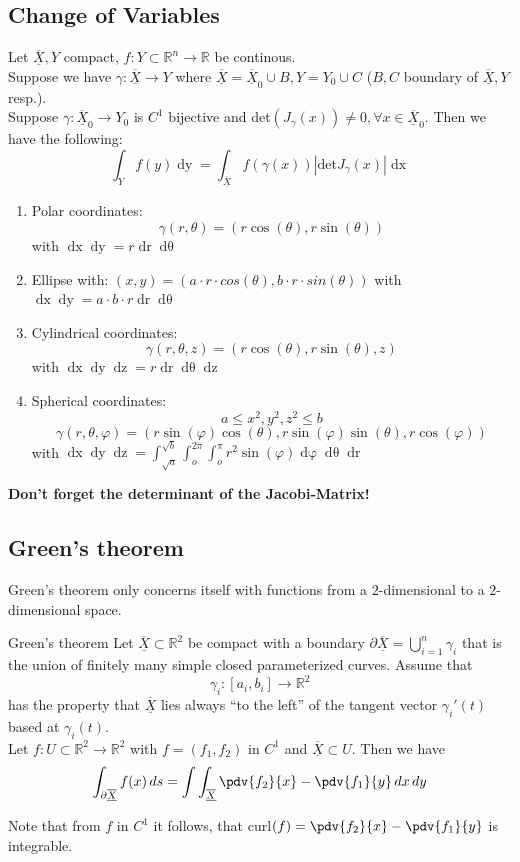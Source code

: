 \documentclass[a4paper,fontsize = 10pt]{article}
\def\R{\mathbb{R}}
\def\X{\underline{\overline{X}}}
\begin{document}
\subsection{Change of Variables}
Let $\X, Y$ compact, $f: Y \subset \R^n \to \R$ be continous. 
\\Suppose we have $\gamma: \X \to Y$ where $\X = \X_0 \cup B, Y = Y_0 \cup C$ ($B,C$ boundary of $\X,Y$ resp.).
\\Suppose $\gamma: \X_0 \to Y_0$ is $C^1$ bijective and det$(J_\gamma(x)) \neq 0, \forall x \in \X_0$.
Then we have the following:
\[\int_Yf(y)\mathop{dy} = \int_{\X}f(\gamma(x))|\text{det}J_{\gamma}(x)|\mathop{dx}\]

\begin{enumerate}
  \item Polar coordinates: \[\gamma(r, \theta) = (r \cos(\theta), r \sin(\theta))\] with \(\mathop{dx}\mathop{dy} = r \mathop{dr} \mathop{d\theta}\)
  \item Ellipse with: $(x,y) = (a \cdot r\cdot cos(\theta), b \cdot r \cdot sin(\theta))$ with $\mathop{dx} \mathop{dy} = a \cdot b \cdot r \mathop{dr} \mathop{d \theta}$
  \item Cylindrical coordinates: \[\gamma(r, \theta, z) = (r \cos(\theta), r \sin(\theta), z)\] with \(\mathop{dx} \mathop{dy} \mathop{dz} = r \mathop{dr} \mathop{d\theta} \mathop{dz}\)
  \item Spherical coordinates: \[ a \le x^2,y^2,z^2 \le b\] \[\gamma(r, \theta, \varphi) = (r\sin(\varphi)\cos(\theta), r \sin(\varphi)\sin(\theta), r \cos(\varphi))\] with \(\mathop{dx}\mathop{dy}\mathop{dz} = \int_{\sqrt{a}}^{\sqrt{b}}\int_{o}^{2\pi}\int_{o}^{\pi}  r^2 \sin(\varphi) \mathop{d\varphi} \mathop{d\theta} \mathop{dr}\)
\end{enumerate}

\textbf{Don't forget the determinant of the Jacobi-Matrix!}


\subsection{Green's theorem}
Green's theorem only concerns itself with functions from a $2$-dimensional to a $2$-dimensional space. 

\begin{mainbox}{Green's theorem}
  Let $\X \subset \R^2$ be compact with a boundary $\partial \X = \bigcup_{i = 1}^{n}\gamma_i$ that is the union of finitely many simple closed parameterized curves. Assume that 
  \[\gamma_i: [a_i,b_i] \to \R^2\]
  has the property that $\X$ lies always ``to the left'' of the tangent vector $\gamma_i'(t)$ based at $\gamma_i(t)$. 
  \\Let $f: U \subset \R^2 \to \R^2$ with $f = (f_1, f_2)$ in $C^1$ and $\X \subset U$. Then we have
  \[\int_{\partial\X}f(x)\mathop{ds} = \int \int_{\X} \pdv{f_2}{x}-\pdv{f_1}{y} \mathop{dx}\mathop{dy}\]
\end{mainbox}
Note that from $f$ in $C^1$ it follows, that curl$(f) = \pdv{f_2}{x}-\pdv{f_1}{y}$ is integrable.
\end{document}
